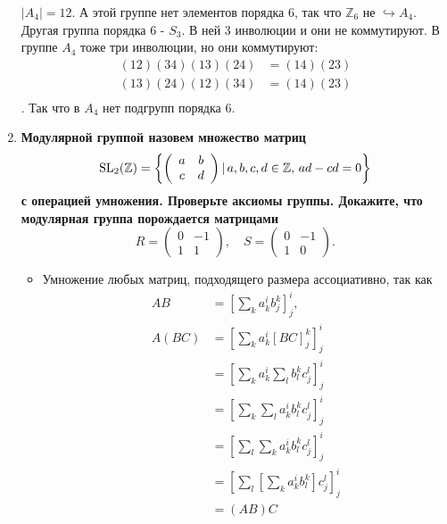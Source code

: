 \documentclass{article}
\begin{document}
\begin{enumerate}
        $|A_4|=12$. А этой группе нет элементов порядка 6, так что
        $\mathbb{Z}_6$ не $\hookrightarrow A_4$. Другая группа порядка 6 -
        $S_3$. В ней 3 инволюции и они не коммутируют. В группе $A_4$ тоже
        три инволюции, но они коммутируют:
        \begin{align*}
            (12)(34)(13)(24)&=(14)(23)\\
            (13)(24)(12)(34)&=(14)(23)\\
        \end{align*}. Так что в $A_4$ нет подгрупп порядка 6.
    \item \textbf{Модулярной группой назовем множество матриц
        \[
            \textnormal{SL}_2(\mathbb{Z}) = \left\{
                \left(\begin{array}{cc} a & b\\ c & d\end{array}\right)
                |\, a,b,c,d\in\mathbb{Z},\,ad-cd=0
            \right\}
        \]
        с операцией умножения. Проверьте аксиомы группы. Докажите, что 
        модулярная группа порождается матрицами
        \[
            R = \left(\begin{array}{cc} 0 & -1\\ 1 & 1\end{array}\right),\quad
            S = \left(\begin{array}{cc} 0 & -1\\ 1 & 0\end{array}\right).
        \]}
        \begin{itemize}
            \item Умножение любых матриц, подходящего размера ассоциативно, так
                как
                \begin{align*}
                    AB&=\left[\sum_ka_k^ib_j^k\right]_j^i,\\
                    A(BC)&=\left[\sum_ka_k^i\left[BC\right]_j^k\right]_j^i\\
                    &=\left[\sum_ka_k^i\sum_lb_l^kc_j^l\right]_j^i\\
                    &=\left[\sum_k\sum_la_k^ib_l^kc_j^l\right]_j^i\\
                    &=\left[\sum_l\sum_ka_k^ib_l^kc_j^l\right]_j^i\\
                    &=\left[\sum_l\left[\sum_ka_k^ib_l^k\right]c_j^l\right]_j^i\\
                    &=\left(AB\right)C
                \end{align*}

\end{itemize}
\end{enumerate}
\end{document}

